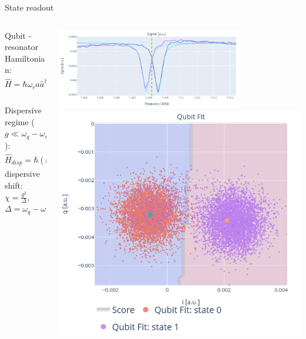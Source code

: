 \documentclass[aspectratio=169,10pt]{beamer}
\begin{document}
\begin{frame}{State readout}
  \begin{columns}
    \begin{column}{0.35\textwidth}
      Qubit - resonator Hamiltonian:
      \begin{equation*}
        \hat{H} = \hbar\omega_r\hat{a}\hat{a}^\dagger - \frac{\hbar\omega_{01}}{2}\hat{\sigma}_z + \hbar g(\hat{\sigma}^+\hat{a}+\hat{\sigma}^-\hat{a}^\dagger)
      \end{equation*}\\
      \vspace{1.5em}
      Dispersive regime ($g \ll \omega_q - \omega_r$):
      \begin{equation*}
        \hat{H}_{disp} = \hbar(\omega_r - \chi\hat{\sigma}_z)\hat{a}^\dagger\hat{a} - \frac{\hbar}{2}(\omega_{01}+\chi)\hat{\sigma}_z
      \end{equation*}
      dispersive shift: $\chi = \frac{g^2}{\Delta},$ \hfill $\Delta = \omega_q - \omega_r$
    \end{column}
    \begin{column}{0.65\textwidth}
      \centering
      \includegraphics[width=0.75\textwidth]{figures/disp_sihft.png}
      \hspace{5mm}
      \includegraphics[height=0.48\textwidth]{figures/classification.png}
    \end{column}
  \end{columns}
\end{frame}
\end{document}
